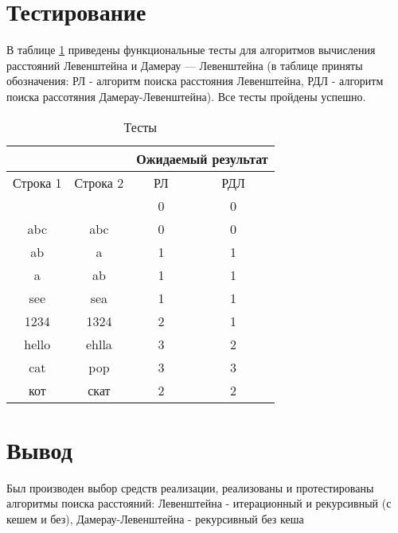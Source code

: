 \section{Тестирование}

В таблице \ref{test} приведены функциональные тесты для алгоритмов вычисления расстояний Левенштейна и Дамерау — Левенштейна (в таблице приняты обозначения: РЛ - алгоритм поиска расстояния Левенштейна, РДЛ - алгоритм поиска рассотяния Дамерау-Левенштейна). Все тесты пройдены успешно.

\begin{table}[h]
	\begin{center}
		\caption{\label{test} Тесты}
		\begin{tabular}{|c|c|c|c|}
			\hline
			&                    & \multicolumn{2}{c|}{\bfseries Ожидаемый результат}    \\ \cline{3-4}\hline
			Строка 1& Строка 2 & РЛ & РДЛ \\ [0.5ex] 
			\hline
			 &  & 0 & 0\\
			\hline
			abc & abc & 0 & 0\\
			\hline
			ab & a & 1 & 1\\
			\hline
			a & ab & 1 & 1\\
			\hline
			see & sea & 1 & 1\\
			\hline
			1234 & 1324 & 2 & 1\\
			\hline
			hello & ehlla & 3 & 2\\
			\hline
			cat & pop & 3 & 3\\
			\hline
			кот & скат & 2 & 2\\
			\hline
		\end{tabular}
	\end{center}
\end{table}


\section*{Вывод}

Был производен выбор средств реализации, реализованы и протестированы алгоритмы поиска расстояний: Левенштейна - итерационный и рекурсивный (с кешем и без), Дамерау-Левенштейна - рекурсивный без кеша

